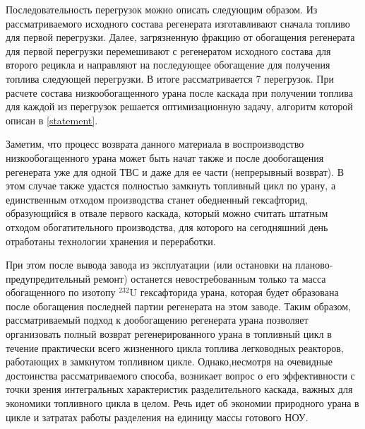 Последовательность перегрузок можно описать следующим образом. Из рассматриваемого исходного состава регенерата изготавливают сначала топливо для первой перегрузки. Далее, загрязненную фракцию от обогащения регенерата для первой перегрузки перемешивают с регенератом исходного состава для второго рецикла и направляют на последующее обогащение для получения топлива следующей перегрузки. В итоге рассматривается 7 перегрузок. При расчете состава низкообогащенного урана после каскада при получении топлива для каждой из перегрузок решается оптимизационную задачу, алгоритм которой описан в \ref{statement}.

Заметим, что процесс возврата данного материала в воспроизводство низкообогащенного урана может быть начат также и после дообогащения регенерата уже для одной ТВС и даже для ее части (непрерывный возврат). В этом случае также удастся полностью замкнуть топливный цикл по урану, а единственным отходом производства станет обедненный гексафторид, образующийся в отвале первого каскада, который можно считать штатным отходом обогатительного производства, для которого на сегодняшний день отработаны технологии хранения и переработки.

При этом после вывода завода из эксплуатации (или остановки на планово-предупредительный ремонт) останется невостребованным только та масса обогащенного по изотопу $^{232}$U гексафторида урана, которая будет образована после обогащения последней партии регенерата на этом заводе. Таким образом, рассматриваемый подход к дообогащению регенерата урана позволяет организовать полный возврат регенерированного урана в топливный цикл в течение практически всего жизненного цикла топлива легководных реакторов, работающих в замкнутом топливном цикле. Однако,несмотря на очевидные достоинства рассматриваемого способа, возникает вопрос о его эффективности с точки зрения интегральных характеристик разделительного каскада, важных для экономики топливного цикла в целом. Речь идет об экономии природного урана в цикле и затратах работы разделения на единицу массы готового НОУ.


